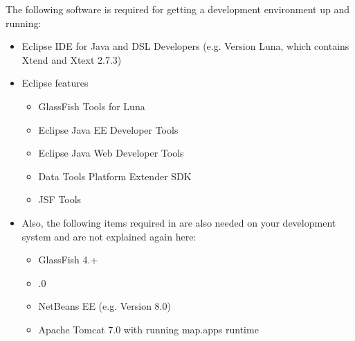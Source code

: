
The following software is required for getting a development environment up and running:

\begin{itemize}
\item Eclipse IDE for Java and DSL Developers (e.g. Version Luna, which contains Xtend and Xtext 2.7.3)
\item Eclipse features
\begin{itemize}
	\item GlassFish Tools for Luna
	\item Eclipse Java EE Developer Tools
	\item Eclipse Java Web Developer Tools
	\item Data Tools Platform Extender SDK
	\item JSF Tools
\end{itemize}
\item Also, the following items required in  are also needed on your development system and are not explained again here:
\begin{itemize}
	\item GlassFish 4.+
	\item {}.0
	\item NetBeans EE (e.g. Version 8.0)
	\item Apache Tomcat 7.0 with running map.apps runtime
\end{itemize}
\end{itemize}





